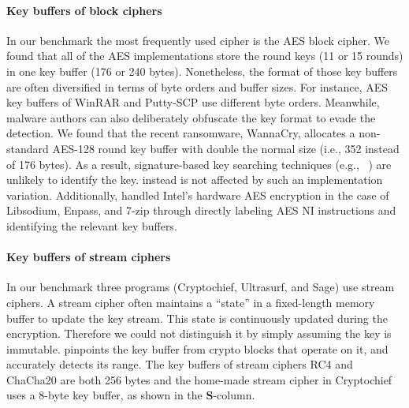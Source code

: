 \paragraph{Key buffers of block ciphers}
In our benchmark the most frequently used cipher is the \textsf{\small AES} block cipher.
We found that all of the \textsf{\small AES} implementations store the round keys (11 or 15 rounds) in one key buffer (176 or 240 bytes).
Nonetheless, the format of those key buffers are often diversified in terms of byte orders and buffer sizes.
For instance, \textsf{\small AES} key buffers of \textsf{\small WinRAR} and \textsf{\small Putty-SCP} use different byte orders. Meanwhile, malware authors can also deliberately obfuscate the key format to evade the detection. We found that the recent ransomware, \textsf{\small WannaCry},  allocates a non-standard \textsf{\small AES-128} round key buffer with double the normal size (i.e., 352 instead of 176 bytes). 
As a result, signature-based key searching techniques (e.g., ~\cite{shamir1999playing, maartmann2009persistence, aeskeyfind_debian}) are unlikely to identify the key. 
\sysname instead is not affected by such an implementation variation. %
Additionally, \sysname handled Intel's hardware \textsf{\small AES} encryption in the case of \textsf{\small Libsodium}, \textsf{\small Enpass}, and \textsf{\small 7-zip} through directly labeling \textsf{\small AES NI} instructions and identifying the relevant key buffers.

\paragraph{Key buffers of stream ciphers}
In our benchmark three programs (\textsf{\small Cryptochief, Ultrasurf}, and \textsf{\small Sage}) use stream ciphers.
A stream cipher often maintains a ``state'' in a fixed-length memory buffer to update the key stream. 
This state is continuously updated during the encryption.
Therefore we could not distinguish it by simply assuming the key is immutable.
\sysname pinpoints the key buffer from crypto blocks that operate on it, and accurately detects its range.
The key buffers of stream ciphers \textsf{\small RC4} and \textsf{\small ChaCha20} are both 256 bytes and the home-made stream cipher in \textsf{\small Cryptochief}~\cite{cryptochief_cryptozoo} uses a 8-byte key buffer, as shown in the \textbf{S}-column.

